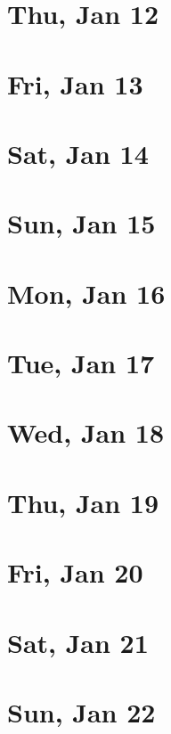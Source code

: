 	\section{Thu, Jan 12}
		
	\section{Fri, Jan 13}
		
	\section{Sat, Jan 14}
		
	\section{Sun, Jan 15}
		
	\section{Mon, Jan 16}
		
	\section{Tue, Jan 17}
		
	\section{Wed, Jan 18}
		
	\section{Thu, Jan 19}
		
	\section{Fri, Jan 20}
		
	\section{Sat, Jan 21}
		
	\section{Sun, Jan 22}
		
